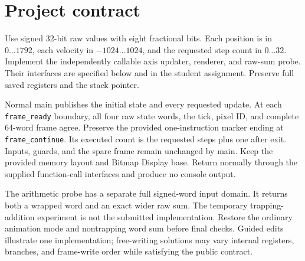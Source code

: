 \section*{Project contract}
Use signed 32-bit raw values with eight fractional bits. Each position is in
\(0\ldots1792\), each velocity in \(-1024\ldots1024\), and the requested step
count in \(0\ldots32\). Implement the independently callable axis updater,
renderer, and raw-sum probe. Their interfaces are specified below and in the
student assignment. Preserve full saved registers and the stack pointer.

Normal main publishes the initial state and every requested update. At each
\texttt{frame\_ready} boundary, all four raw state words, the tick, pixel ID,
and complete 64-word frame agree. Preserve the provided one-instruction marker
ending at \texttt{frame\_continue}. Its executed count is the requested steps
plus one after exit. Inputs, guards, and the spare frame remain unchanged by main.
Keep the provided memory layout and Bitmap Display base. Return normally through
the supplied function-call interfaces and produce no console output.

The arithmetic probe has a separate full signed-word input domain. It returns
both a wrapped word and an exact wider raw sum. The temporary trapping-addition
experiment is not the submitted implementation. Restore the ordinary animation
mode and nontrapping word sum before final checks. Guided edits illustrate one
implementation; free-writing solutions may vary internal registers, branches,
and frame-write order while satisfying the public contract.
